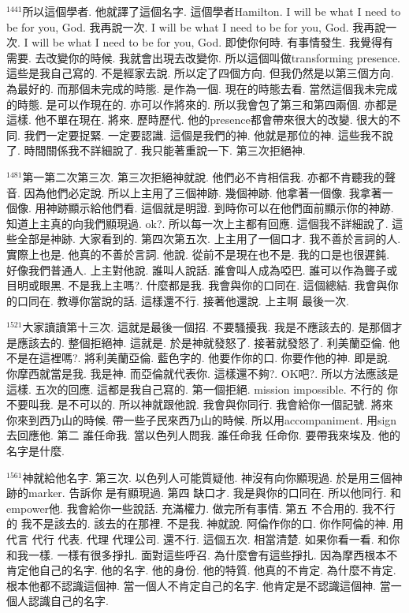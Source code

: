 \documentclass{book}
\begin{document}
$^{1441}$所以這個學者.
他就譯了這個名字.
這個學者Hamilton.
I will be what I need to be for you, God.
我再說一次.
I will be what I need to be for you, God.
我再說一次.
I will be what I need to be for you, God.
即使你何時.
有事情發生.
我覺得有需要.
去改變你的時候.
我就會出現去改變你.
所以這個叫做transforming presence.
這些是我自己寫的.
不是經家去說.
所以定了四個方向.
但我仍然是以第三個方向.
為最好的.
而那個未完成的時態.
是作為一個.
現在的時態去看.
當然這個我未完成的時態.
是可以作現在的.
亦可以作將來的.
所以我會包了第三和第四兩個.
亦都是這樣.
他不單在現在.
將來.
歷時歷代.
他的presence都會帶來很大的改變.
很大的不同.
我們一定要捉緊.
一定要認識.
這個是我們的神.
他就是那位的神.
這些我不說了.
時間關係我不詳細說了.
我只能著重說一下.
第三次拒絕神.

$^{1481}$第一第二次第三次.
第三次拒絕神就說.
他們必不肯相信我.
亦都不肯聽我的聲音.
因為他們必定說.
所以上主用了三個神跡.
幾個神跡.
他拿著一個像.
我拿著一個像.
用神跡顯示給他們看.
這個就是明證.
到時你可以在他們面前顯示你的神跡.
知道上主真的向我們顯現過.
ok?.
所以每一次上主都有回應.
這個我不詳細說了.
這些全部是神跡.
大家看到的.
第四次第五次.
上主用了一個口才.
我不善於言詞的人.
實際上也是.
他真的不善於言詞.
他說.
從前不是現在也不是.
我的口是也很遲鈍.
好像我們普通人.
上主對他說.
誰叫人說話.
誰會叫人成為啞巴.
誰可以作為聾子或目明或眼黑.
不是我上主嗎?.
什麼都是我.
我會與你的口同在.
這個總結.
我會與你的口同在.
教導你當說的話.
這樣還不行.
接著他還說.
上主啊 最後一次.

$^{1521}$大家讀讀第十三次.
這就是最後一個招.
不要騷擾我.
我是不應該去的.
是那個才是應該去的.
整個拒絕神.
這就是.
於是神就發怒了.
接著就發怒了.
利美蘭亞倫.
他不是在這裡嗎?.
將利美蘭亞倫.
藍色字的.
他要作你的口.
你要作他的神.
即是說.
你摩西就當是我.
我是神.
而亞倫就代表你.
這樣還不夠?.
OK吧?.
所以方法應該是這樣.
五次的回應.
這都是我自己寫的.
第一個拒絕.
mission impossible.
不行的 你不要叫我.
是不可以的.
所以神就跟他說.
我會與你同行.
我會給你一個記號.
將來你來到西乃山的時候.
帶一些子民來西乃山的時候.
所以用accompaniment.
用sign去回應他.
第二 誰任命我.
當以色列人問我.
誰任命我 任命你.
要帶我來埃及.
他的名字是什麼.

$^{1561}$神就給他名字.
第三次.
以色列人可能質疑他.
神沒有向你顯現過.
於是用三個神跡的marker.
告訴你 是有顯現過.
第四 缺口才.
我是與你的口同在.
所以他同行.
和empower他.
我會給你一些說話.
充滿權力.
做完所有事情.
第五 不合用的.
我不行的 我不是該去的.
該去的在那裡.
不是我.
神就說.
阿倫作你的口.
你作阿倫的神.
用代言 代行 代表.
代理 代理公司.
還不行.
這個五次.
相當清楚.
如果你看一看.
和你和我一樣.
一樣有很多掙扎.
面對這些呼召.
為什麼會有這些掙扎.
因為摩西根本不肯定他自己的名字.
他的名字.
他的身份.
他的特質.
他真的不肯定.
為什麼不肯定.
根本他都不認識這個神.
當一個人不肯定自己的名字.
他肯定是不認識這個神.
當一個人認識自己的名字.
\end{document}

